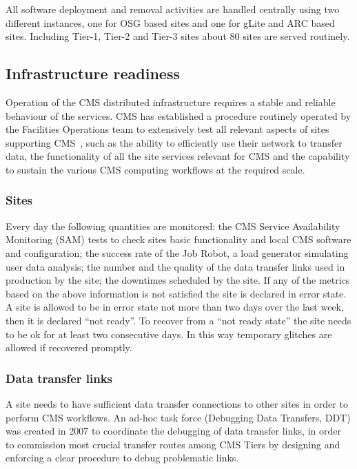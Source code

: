 All software deployment and  removal activities are handled centrally
using two different instances, one for OSG based sites and one for
gLite and ARC based sites. Including Tier-1, Tier-2 and Tier-3
sites about 80 sites are served routinely.

\subsection{Infrastructure readiness}
\label{sec:4_2}
Operation of the CMS distributed infrastructure requires a stable and 
reliable behaviour of the services.
CMS has established a procedure routinely operated by the Facilities 
Operations team to extensively test all relevant aspects of sites 
supporting CMS~\cite{RefSite}, such as the ability to efficiently use their 
network to transfer data, the functionality of all the site services relevant 
for CMS and the capability to sustain the various CMS computing workflows at 
the required scale.

\subsubsection{ Sites }
\label{sec:4_2_1} 
Every day the following quantities are monitored:
the CMS Service Availability Monitoring (SAM) tests to check sites basic 
functionality and local CMS software and configuration;
the success rate of the Job Robot, a load generator simulating
user data analysis; the number and the quality of the data
transfer links used in production by the site;
the downtimes scheduled by the site.
If any of the metrics based on the above information is not satisfied the site is declared in error state. A site is allowed to be in error state
not more than two days over the last week, then it is declared ``not ready''.
To recover from a ``not ready state'' the site needs to be ok for at least two consecutive days. In this way temporary glitches are allowed if recovered promptly.

\subsubsection{ Data transfer links }
\label{sec:LinkCommissioning}
A site needs to have sufficient data transfer connections to other sites in
order to perform CMS workflows. 
An ad-hoc task force (Debugging Data Transfers, DDT)\cite{RefDDT}
was created in 2007 to coordinate the debugging of data transfer links,
in order to commission most crucial transfer routes among CMS Tiers 
by designing and enforcing a clear procedure to debug problematic links.

